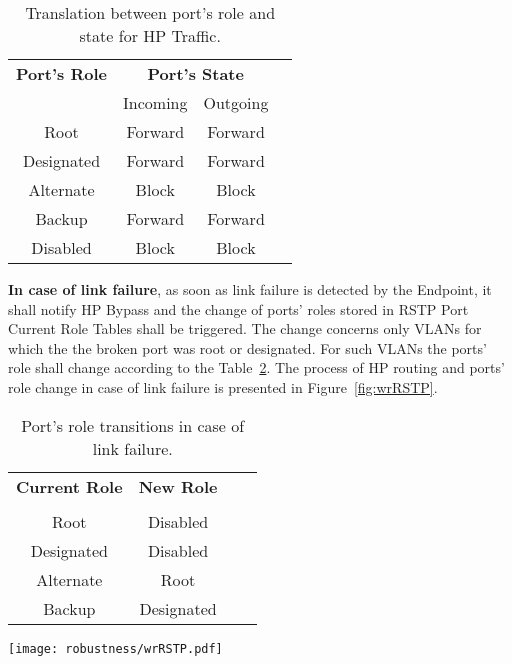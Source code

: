 \begin{table}[ht]
\caption{Translation between port's role and state for HP Traffic.} 
\centering
	\begin{tabular}{| c | c | c | c |}          \hline
\textbf{Port's Role}& \multicolumn{2}{|c|}{\textbf{Port's State}}  \\
                    & Incoming   & Outgoing     \\ \hline
Root                & Forward    & Forward      \\ \hline
Designated          & Forward    & Forward      \\ \hline
Alternate           & Block      & Block        \\ \hline
Backup              & Forward    & Forward      \\ \hline
Disabled            & Block      & Block        \\ \hline
\end{tabular}
\label{tab:portRoleStatetrans}
\end{table}

\textbf{In case of link failure}, as soon as link failure is detected by the
Endpoint, it shall notify HP Bypass and the change of ports' roles stored in
RSTP Port Current Role Tables shall be triggered. The change concerns only VLANs
for which the the broken port was root or designated. For such VLANs the ports'
role shall change according to the Table~\ref{tab:portRoleTransition}.
The process of HP routing and ports' role change in case of link failure is
presented in Figure~\ref{fig:wrRSTP}.

\begin{table}[ht]
\caption{Port's role transitions in case of link failure.} 
\centering
	\begin{tabular}{| c | c | c | c |}          \hline
\textbf{Current Role}& \textbf{New Role}  \\
                     &               \\ \hline
Root                 & Disabled      \\ \hline
Designated           & Disabled      \\ \hline
Alternate            & Root          \\ \hline
Backup               & Designated    \\ \hline
\end{tabular}
\label{tab:portRoleTransition}
\end{table}

\begin{center}
	\texttt{[image: robustness/wrRSTP.pdf]}
	\label{fig:wrRSTP}
\end{center}
